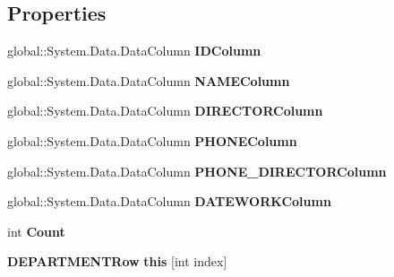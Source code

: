 \subsection*{Properties}
\begin{CompactItemize}
\item 
global::System.Data.DataColumn \textbf{IDColumn}\hspace{0.3cm}{\tt  [get]}\label{class_automatic_medical_system_1_1_data_set2_1_1_d_e_p_a_r_t_m_e_n_t_data_table_e58db99a83cd3398f9dadf7e2fae5ccc}

\item 
global::System.Data.DataColumn \textbf{NAMEColumn}\hspace{0.3cm}{\tt  [get]}\label{class_automatic_medical_system_1_1_data_set2_1_1_d_e_p_a_r_t_m_e_n_t_data_table_6bfabff7c144c6421a7f061c99aabd7f}

\item 
global::System.Data.DataColumn \textbf{DIRECTORColumn}\hspace{0.3cm}{\tt  [get]}\label{class_automatic_medical_system_1_1_data_set2_1_1_d_e_p_a_r_t_m_e_n_t_data_table_de5d764de67ee0a86885d737318edfbd}

\item 
global::System.Data.DataColumn \textbf{PHONEColumn}\hspace{0.3cm}{\tt  [get]}\label{class_automatic_medical_system_1_1_data_set2_1_1_d_e_p_a_r_t_m_e_n_t_data_table_d1f40132702be7e242e7ea30b3e177fc}

\item 
global::System.Data.DataColumn \textbf{PHONE\_\-DIRECTORColumn}\hspace{0.3cm}{\tt  [get]}\label{class_automatic_medical_system_1_1_data_set2_1_1_d_e_p_a_r_t_m_e_n_t_data_table_f44d372079b51c9ca9796d59f678fab3}

\item 
global::System.Data.DataColumn \textbf{DATEWORKColumn}\hspace{0.3cm}{\tt  [get]}\label{class_automatic_medical_system_1_1_data_set2_1_1_d_e_p_a_r_t_m_e_n_t_data_table_2d6806e9ab0506252c4a0788fbe6c949}

\item 
int \textbf{Count}\hspace{0.3cm}{\tt  [get]}\label{class_automatic_medical_system_1_1_data_set2_1_1_d_e_p_a_r_t_m_e_n_t_data_table_2b3c3bad263950b964520f5cc2c5da1b}

\item 
{\bf DEPARTMENTRow} \textbf{this} [int index]\hspace{0.3cm}{\tt  [get]}\label{class_automatic_medical_system_1_1_data_set2_1_1_d_e_p_a_r_t_m_e_n_t_data_table_713db7bce02d2a6b0381f76ea54c6abf}

\end{CompactItemize}
